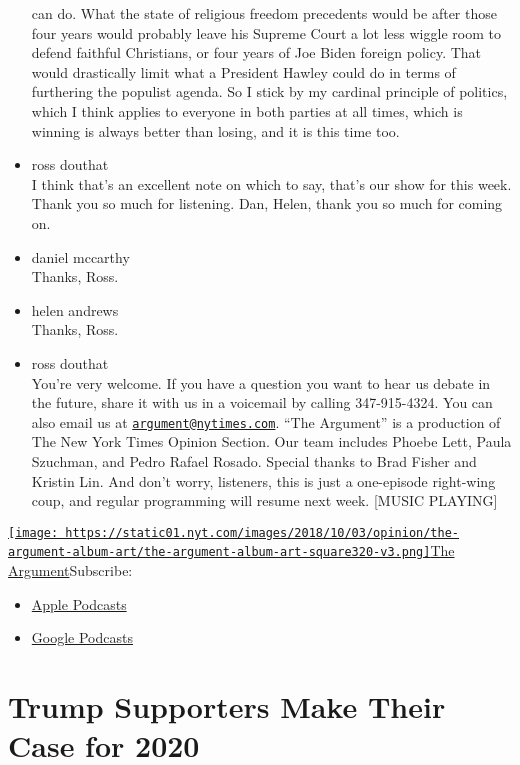 \begin{itemize}
  can do. What the state of religious freedom precedents would be after
  those four years would probably leave his Supreme Court a lot less
  wiggle room to defend faithful Christians, or four years of Joe Biden
  foreign policy. That would drastically limit what a President Hawley
  could do in terms of furthering the populist agenda. So I stick by my
  cardinal principle of politics, which I think applies to everyone in
  both parties at all times, which is winning is always better than
  losing, and it is this time too.
\item
  ross douthat\\
  I think that's an excellent note on which to say, that's our show for
  this week. Thank you so much for listening. Dan, Helen, thank you so
  much for coming on.
\item
  daniel mccarthy\\
  Thanks, Ross.
\item
  helen andrews\\
  Thanks, Ross.
\item
  ross douthat\\
  You're very welcome. If you have a question you want to hear us debate
  in the future, share it with us in a voicemail by calling
  347-915-4324. You can also email us at
  \href{mailto:argument@nytimes.com}{\nolinkurl{argument@nytimes.com}}.
  ``The Argument'' is a production of The New York Times Opinion
  Section. Our team includes Phoebe Lett, Paula Szuchman, and Pedro
  Rafael Rosado. Special thanks to Brad Fisher and Kristin Lin. And
  don't worry, listeners, this is just a one-episode right-wing coup,
  and regular programming will resume next week. {[}MUSIC PLAYING{]}
\end{itemize}

\href{https://www.nytimes.com/column/the-argument}{\texttt{[image: https://static01.nyt.com/images/2018/10/03/opinion/the-argument-album-art/the-argument-album-art-square320-v3.png]}The
Argument}Subscribe:

\begin{itemize}
\tightlist
\item
  \href{https://itunes.apple.com/us/podcast/id1438024613}{Apple
  Podcasts}
\item
  \href{https://www.google.com/podcasts?feed=aHR0cHM6Ly9yc3MuYXJ0MTkuY29tL3RoZS1hcmd1bWVudA\%3D\%3D}{Google
  Podcasts}
\end{itemize}

\hypertarget{trump-supporters-make-their-case-for-2020-1}{%
\section{Trump Supporters Make Their Case for
2020}\label{trump-supporters-make-their-case-for-2020-1}}

